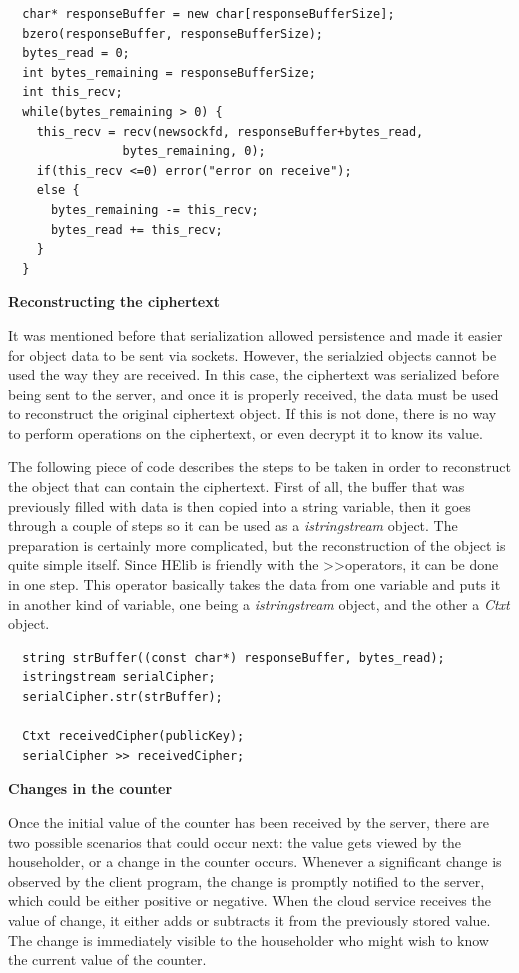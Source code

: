 \begin{lstlisting}
  char* responseBuffer = new char[responseBufferSize];
  bzero(responseBuffer, responseBufferSize);
  bytes_read = 0;
  int bytes_remaining = responseBufferSize;
  int this_recv;
  while(bytes_remaining > 0) {    
    this_recv = recv(newsockfd, responseBuffer+bytes_read,
                bytes_remaining, 0); 
    if(this_recv <=0) error("error on receive");
    else {
      bytes_remaining -= this_recv;
      bytes_read += this_recv;
    }
  }
\end{lstlisting}

\textbf{Reconstructing the ciphertext}

It was mentioned before that serialization allowed persistence and made it easier for object data to be sent via sockets. However, the serialzied objects cannot be used the way they are received. In this case, the ciphertext was serialized before being sent to the server, and once it is properly received, the data must be used to reconstruct the original ciphertext object.
If this is not done, there is no way to perform operations on the ciphertext, or even decrypt it to know its value.

The following piece of code describes the steps to be taken in order to reconstruct the object that can contain the ciphertext. First of all, the buffer that was previously filled with data is then copied into a string variable, then it goes through a couple of steps so it can be used as a \textit{istringstream} object. The preparation is certainly more complicated, but the reconstruction of the object is quite simple itself. Since HElib is friendly with the \textgreater\textgreater operators, it can be done in one step. This operator basically takes the data from one variable and puts it in another kind of variable, one being a \textit{istringstream} object, and the other a \textit{Ctxt} object.

\begin{lstlisting}
  string strBuffer((const char*) responseBuffer, bytes_read);
  istringstream serialCipher;
  serialCipher.str(strBuffer);

  Ctxt receivedCipher(publicKey);
  serialCipher >> receivedCipher;
\end{lstlisting}


\textbf{Changes in the counter}

Once the initial value of the counter has been received by the server, there are two possible scenarios that could occur next: the value gets viewed by the householder, or a change in the counter occurs. Whenever a significant change is observed by the client program, the change is promptly notified to the server, which could be either positive or negative. When the cloud service receives the value of change, it either adds or subtracts it from the previously stored value. The change is immediately visible to the householder who might wish to know the current value of the counter.


